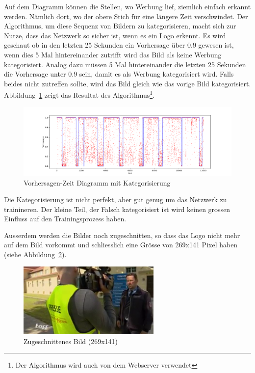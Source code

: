 \documentclass[12pt,a4paper]{report}
\begin{document}
Auf dem Diagramm können die Stellen, wo Werbung lief, ziemlich einfach erkannt werden.
Nämlich dort, wo der obere Stich für eine längere Zeit verschwindet.
Der Algorithmus, um diese Sequenz von Bildern zu kategorisieren, macht sich zur Nutze,
dass das Netzwerk so sicher ist, wenn es ein Logo erkennt.
Es wird geschaut ob in den letzten 25 Sekunden ein Vorhersage über 0.9 gewesen ist,
wenn dies 5 Mal hintereinander zutrifft wird das Bild als keine Werbung kategorisiert.
Analog dazu müssen 5 Mal hintereinander die letzten 25 Sekunden die Vorhersage unter 0.9 sein,
damit es als Werbung kategorisiert wird.
Falls beides nicht zutreffen sollte, wird das Bild gleich wie das vorige Bild kategorisiert.
Abbildung~\ref{fig:points_line} zeigt das Resultat des Algorithmus\footnote{Der Algorithmus wird auch von dem Webserver verwendet}.
\begin{figure}[h]%
    \centering
    \includegraphics[width=1.0\textwidth]{assets/python/points_blue_line.pdf}%
    \caption{Vorhersagen-Zeit Diagramm mit Kategorisierung}%
    \label{fig:points_line}%
\end{figure}
Die Kategorisierung ist nicht perfekt, aber gut genug um das Netzwerk zu trainineren.
Der kleine Teil, der Falsch kategorisiert ist wird keinen grossen Einfluss auf den Trainingsprozess haben.

Ausserdem werden die Bilder noch zugeschnitten, so dass das Logo nicht mehr auf dem Bild vorkommt und schliesslich
eine Grösse von 269x141 Pixel haben (siehe Abbildung~\ref{fig:cropped_img}).
\begin{figure}[h]%
    \centering
    \includegraphics[width=7cm]{assets/images/cropped.png}%
    \caption{Zugeschnittenes Bild (269x141)}%
    \label{fig:cropped_img}%
\end{figure}
\end{document}

